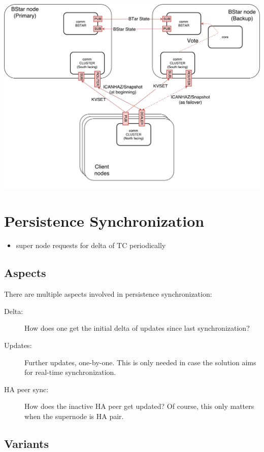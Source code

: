 \includegraphics[width=\textwidth]{img/ML-HA_bstar.pdf}

\section{Persistence Synchronization}\label{sec:meth:psync}
\begin{itemize}
	\item super node requests for delta of TC periodically
\end{itemize}

\subsection{Aspects}

There are multiple aspects involved in persistence synchronization:

\begin{description}
	\item [Delta:]
		How does one get the initial delta of updates since last
		synchronization?

	\item [Updates:]
		Further updates, one-by-one. This is only needed in
		case the solution aims for real-time synchronization.

	\item [HA peer sync:]
		How does the inactive HA peer get updated? Of
		course, this only matters when the supernode is HA pair.
\end{description}

\subsection{Variants}

